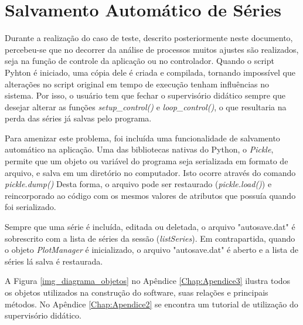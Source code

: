 \section{Salvamento Automático de Séries}

Durante a realização do caso de teste, descrito posteriormente neste documento, percebeu-se que no decorrer da análise de processos muitos ajustes são realizados, seja na função de controle da aplicação ou no controlador. Quando o script Pyhton é iniciado, uma cópia dele é criada e compilada, tornando impossível que alterações no script original em tempo de execução tenham influências no sistema. Por isso, o usuário tem que fechar o supervisório didático sempre que desejar alterar as funções \emph{setup\_control()} e \emph{loop\_control()}, o que resultaria na perda das séries já salvas pelo programa.

Para amenizar este problema, foi incluída uma funcionalidade de salvamento automático na aplicação. Uma das bibliotecas nativas do Python, o \emph{Pickle}, permite que um objeto ou variável do programa seja serializada em formato de arquivo, e salva em um diretório no computador. Isto ocorre através do comando \emph{pickle.dump()} Desta forma, o arquivo pode ser restaurado (\emph{pickle.load()}) e reincorporado ao código com os mesmos valores de atributos que possuía quando foi serializado.

Sempre que uma série é incluída, editada ou deletada, o arquivo "autosave.dat" é sobrescrito com a lista de séries da sessão (\emph{listSeries}). Em contrapartida, quando o objeto \emph{PlotManager} é inicializado, o arquivo "autosave.dat" é aberto e a lista de séries lá salva é restaurada.

A Figura \ref{img_diagrama_objetos} no Apêndice \ref{Chap:Apendice3} ilustra todos os objetos utilizados na construção do software, suas relações e principais métodos. No Apêndice \ref{Chap:Apendice2} se encontra um tutorial de utilização do supervisório didático.